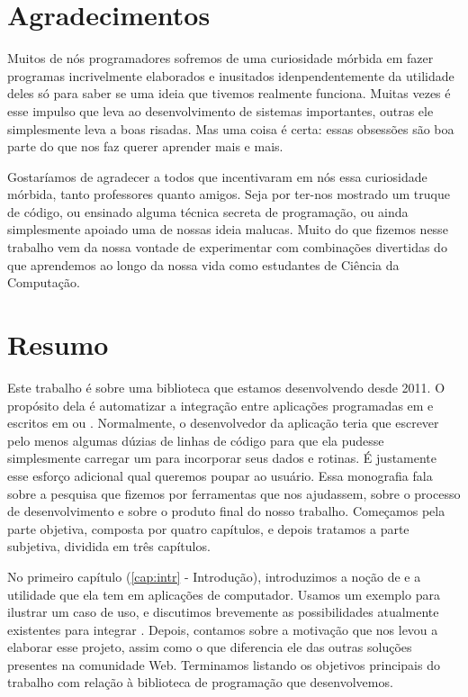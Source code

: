 \documentclass[11pt,twoside,a4paper]{book}
\begin{document}
\chapter*{Agradecimentos}

Muitos de nós programadores sofremos de uma curiosidade mórbida em fazer
programas incrivelmente elaborados e inusitados idenpendentemente da utilidade
deles só para saber se uma ideia que tivemos realmente funciona. Muitas vezes é
esse impulso que leva ao desenvolvimento de sistemas importantes, outras ele
simplesmente leva a boas risadas. Mas uma coisa é certa: essas obsessões são boa
parte do que nos faz querer aprender mais e mais.

Gostaríamos de agradecer a todos que incentivaram em nós essa curiosidade
mórbida, tanto professores quanto amigos. Seja por ter-nos mostrado um truque
de código, ou ensinado alguma técnica secreta de programação, ou ainda
simplesmente apoiado uma de nossas ideia malucas. Muito do que fizemos nesse
trabalho vem da nossa vontade de experimentar com combinações divertidas do que
aprendemos ao longo da nossa vida como estudantes de Ciência da Computação.

\chapter*{Resumo}

Este trabalho é sobre uma biblioteca \CXX{} que estamos desenvolvendo desde
2011. O propósito dela é automatizar a integração entre aplicações programadas
em \CXX{} e  escritos em  ou . Normalmente,
o desenvolvedor da aplicação teria que escrever pelo menos algumas dúzias
de linhas de código para que ela pudesse simplesmente carregar um \script{}
para incorporar seus dados e rotinas. É justamente esse esforço adicional
qual queremos poupar ao usuário. Essa monografia fala sobre a pesquisa que
fizemos por ferramentas que nos ajudassem, sobre o processo de desenvolvimento
e sobre o produto final do nosso trabalho. Começamos pela parte objetiva,
composta por quatro capítulos, e depois tratamos a parte subjetiva, dividida
em três capítulos.

No primeiro capítulo (\ref{cap:intr} - Introdução), introduzimos a noção de
 e a utilidade que ela tem em aplicações de computador. Usamos um
exemplo para ilustrar um caso de uso, e discutimos brevemente as possibilidades
atualmente existentes para integrar . Depois, contamos sobre a
motivação que nos levou a elaborar esse projeto, assim como o que diferencia
ele das outras soluções presentes na comunidade Web. Terminamos listando os
objetivos principais do trabalho com relação à biblioteca de programação
que desenvolvemos.
\end{document}
